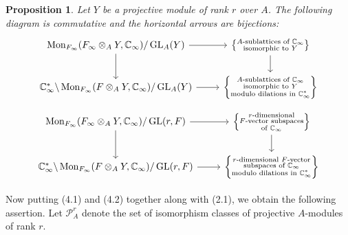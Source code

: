 \documentclass[12pt,a4paper]{article}
\theoremstyle{plain}
\newtheorem{proposition}{Proposition}[section]
\theoremstyle{definition}
\theoremstyle{remark}
\DeclareMathOperator{\Mon}{Mon}
\DeclareMathOperator{\GL}{GL}
\begin{document}
\begin{proposition}
Let $Y$ be a projective module of rank $r$ over $A$. The following diagram is 
commutative and the horizontal arrows are bijections:
\[
\begin{tikzcd}
\Mon_{F_\infty}(F_\infty \otimes_A Y, \mathbb{C}_\infty)/\GL_A(Y) \arrow[r] \arrow[d] & \left\{\substack{\text{$A$-sublattices of $\mathbb{C}_\infty$}\\\text{isomorphic to $Y$}}\right\} \arrow[d] \\
\mathbb{C}_\infty^* \backslash \Mon_{F_\infty}(F \otimes_A Y, \mathbb{C}_\infty)/\GL_A(Y) \arrow[r] & \left\{\substack{\text{$A$-sublattices of $\mathbb{C}_\infty$}\\\text{isomorphic to $Y$}\\\text{modulo dilations in $\mathbb{C}_\infty^*$}}\right\}
\end{tikzcd}
\]
\[
\begin{tikzcd}
\Mon_{F_\infty}(F_\infty \otimes_A Y, \mathbb{C}_\infty)/\GL(r,F) \arrow[r] \arrow[d] & \left\{\substack{\text{$r$-dimensional}\\\text{$F$-vector subspaces}\\\text{of $\mathbb{C}_\infty$}}\right\} \arrow[d] \\
\mathbb{C}_\infty^* \backslash \Mon_{F_\infty}(F \otimes_A Y, \mathbb{C}_\infty)/\GL(r,F) \arrow[r] & \left\{\substack{\text{$r$-dimensional $F$-vector}\\\text{subspaces of $\mathbb{C}_\infty$}\\\text{modulo dilations in $\mathbb{C}_\infty^*$}}\right\}
\end{tikzcd}
\]
\end{proposition}

Now putting (4.1) and (4.2) together along with (2.1), we obtain the 
following assertion. Let $\mathcal{P}_A^r$ denote the set of isomorphism classes 
of projective $A$-modules of rank $r$.
\end{document}
